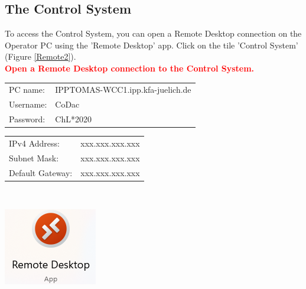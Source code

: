 \documentclass[fleqn,a4paper,20pt]{article}
\begin{document}

\newpage
\subsection{The Control System}
\begin{minipage}{.78\textwidth}
To access the Control System, you can open a Remote Desktop connection on the Operator PC using the 'Remote Desktop' app. Click on the tile 'Control System' (Figure \ref{Remote2}).\\

\textcolor{red}{\textbf{Open a Remote Desktop connection to the Control System.}}\\

\begin{minipage}{.58\textwidth}
	\begin{tabular}{ll}
		PC name: & IPPTOMAS-WCC1.ipp.kfa-juelich.de\\
		Username: &CoDac\\
		Password: &ChL*2020
	\end{tabular}
\end{minipage}
\begin{minipage}{.42\textwidth}
	\begin{tabular}{ll}
		IPv4 Address: & xxx.xxx.xxx.xxx\\
		Subnet Mask:& xxx.xxx.xxx.xxx\\
		Default Gateway:& xxx.xxx.xxx.xxx
	\end{tabular}
\end{minipage}
\vspace{0.6cm}

\end{minipage}
\begin{minipage}{.02\textwidth}
$\ $\\
\end{minipage}
\begin{minipage}{.2\textwidth}
\centering
\includegraphics[width=0.85\linewidth]{Remote1}
\end{minipage}
\end{document}

